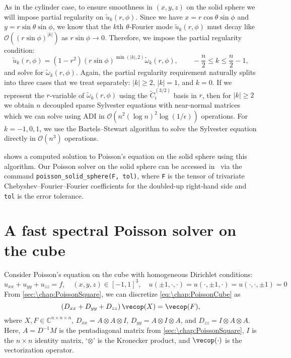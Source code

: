 As in the cylinder case, to ensure smoothness in $(x,y,z)$ on the solid sphere we will impose partial regularity on $\tilde{u}_k(r,\phi)$. Since we have $x = r \cos\theta \sin\phi$ and $y = r \sin\theta \sin\phi$, we know that the $k$th $\theta$-Fourier mode $\tilde{u}_k(r,\phi)$ must decay like $\mathcal{O}((r \sin\phi)^{|k|})$ as $r \sin\phi \rightarrow 0$. Therefore, we impose the partial regularity condition:
\[
\tilde{u}_k(r,\phi) = (1-r^2) (r \sin \phi)^{\min(|k|,2)} \tilde{\omega}_k(r,\phi), \qquad -\frac{n}{2}\leq k\leq \frac{n}{2}-1,
\]
and solve for $\tilde{\omega}_k(r,\phi)$. Again, the partial regularity requirement naturally splits into three cases that we treat separately: $|k| \geq 2$, $|k| = 1$, and $k = 0$. If we represent the $r$-variable of $\tilde{\omega}_k(r,\phi)$ using the $\tilde{C}_i^{(3/2)}$ basis in $r$, then for $|k| \geq 2$ we obtain $n$ decoupled sparse Sylvester equations with near-normal matrices which we can solve using ADI in $\mathcal{O}(n^2 (\log n)^2 \log(1/\epsilon))$ operations. For $k = -1, 0, 1$, we use the Bartels--Stewart algorithm to solve the Sylvester equation directly in $\mathcal{O}(n^3)$ operations.

 shows a computed solution to Poisson's equation on the solid sphere using this algorithm. Our Poisson solver on the solid sphere can be accessed in~\cite{GithubRepoPoisson} via the command \texttt{poisson\_solid\_sphere(F, tol)}, where \texttt{F} is the tensor of trivariate Chebyshev--Fourier--Fourier coefficients for the doubled-up right-hand side and \texttt{tol} is the error tolerance.

\section{A fast spectral Poisson solver on the cube}\label{sec:\chap:PoissonCube}
Consider Poisson's equation on the cube with homogeneous Dirichlet conditions:
\begin{equation}\label{eq:\chap:PoissonCube}
u_{xx} + u_{yy} + u_{zz} = f, \quad (x,y,z) \in [-1,1]^3, \quad 
u(\pm 1,\cdot,\cdot) = u(\cdot,\pm 1, \cdot) = u(\cdot,\cdot,\pm 1) = 0
\end{equation}
From \cref{sec:\chap:PoissonSquare}, we can discretize \cref{eq:\chap:PoissonCube} as 
\begin{equation}\label{eq:\chap:KronCube}
\left( D_{xx} + D_{yy} + D_{zz} \right) \vecop(X) = \vecop(F),
\end{equation}
where $X, F \in \mathbb{C}^{n \times n \times n}$, $D_{xx} = A \otimes A \otimes I$, $D_{yy} = A \otimes I \otimes A$, and $D_{zz} = I \otimes A \otimes A$. Here, $A = D^{-1} M$ is the pentadiagonal matrix from \cref{sec:\chap:PoissonSquare}, $I$ is the $n \times n$ identity matrix, `$\otimes$' is the Kronecker product, and $\vecop(\cdot)$ is the vectorization operator.

